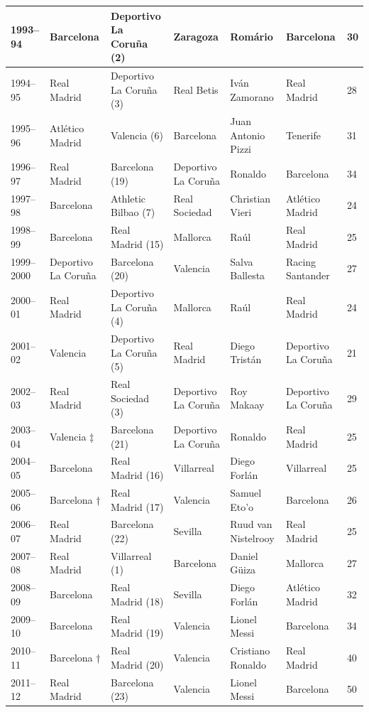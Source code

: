 \documentclass[]{tufte-handout}
\begin{document}
\begin{table}
\begin{tabular}{l|l|l|l|l|l|l}
\hline
1993–94 & Barcelona & Deportivo La Coruña (2) & Zaragoza & Romário & Barcelona & 30\\
\hline
1994–95 & Real Madrid & Deportivo La Coruña (3) & Real Betis & Iván Zamorano & Real Madrid & 28\\
\hline
1995–96 & Atlético Madrid & Valencia (6) & Barcelona & Juan Antonio Pizzi & Tenerife & 31\\
\hline
1996–97 & Real Madrid & Barcelona (19) & Deportivo La Coruña & Ronaldo & Barcelona & 34\\
\hline
1997–98 & Barcelona & Athletic Bilbao (7) & Real Sociedad & Christian Vieri & Atlético Madrid & 24\\
\hline
1998–99 & Barcelona & Real Madrid (15) & Mallorca & Raúl & Real Madrid & 25\\
\hline
1999–2000 & Deportivo La Coruña & Barcelona (20) & Valencia & Salva Ballesta & Racing Santander & 27\\
\hline
2000–01 & Real Madrid & Deportivo La Coruña (4) & Mallorca & Raúl & Real Madrid & 24\\
\hline
2001–02 & Valencia & Deportivo La Coruña (5) & Real Madrid & Diego Tristán & Deportivo La Coruña & 21\\
\hline
2002–03 & Real Madrid & Real Sociedad (3) & Deportivo La Coruña & Roy Makaay & Deportivo La Coruña & 29\\
\hline
2003–04 & Valencia  ‡ & Barcelona (21) & Deportivo La Coruña & Ronaldo & Real Madrid & 25\\
\hline
2004–05 & Barcelona & Real Madrid (16) & Villarreal & Diego Forlán & Villarreal & 25\\
\hline
2005–06 & Barcelona  † & Real Madrid (17) & Valencia & Samuel Eto'o & Barcelona & 26\\
\hline
2006–07 & Real Madrid & Barcelona (22) & Sevilla & Ruud van Nistelrooy & Real Madrid & 25\\
\hline
2007–08 & Real Madrid & Villarreal (1) & Barcelona & Daniel Güiza & Mallorca & 27\\
\hline
2008–09 & Barcelona & Real Madrid (18) & Sevilla & Diego Forlán & Atlético Madrid & 32\\
\hline
2009–10 & Barcelona & Real Madrid (19) & Valencia & Lionel Messi & Barcelona & 34\\
\hline
2010–11 & Barcelona  † & Real Madrid (20) & Valencia & Cristiano Ronaldo & Real Madrid & 40\\
\hline
2011–12 & Real Madrid & Barcelona (23) & Valencia & Lionel Messi & Barcelona & 50\\

\end{tabular}
\end{table}
\end{document}
